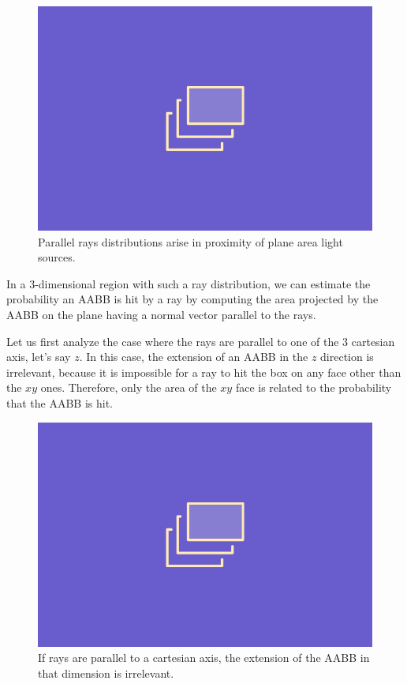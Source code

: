 \documentclass{PoliMi_MasterThesis}
\begin{document}
\begin{figure}[H]
    \centering
    \includegraphics[width=\textwidth*\real{0.5}]{Images/TODO.png}
    \caption{Parallel rays distributions arise in proximity of plane area light sources.}
    \label{fig:parallel_rays_distribution}
\end{figure}

In a 3-dimensional region with such a ray distribution, we can estimate the probability an AABB is hit by a ray by computing the area projected by the AABB on the plane having a normal vector parallel to the rays.

Let us first analyze the case where the rays are parallel to one of the 3 cartesian axis, let's say $z$. In this case, the extension of an AABB in the $z$ direction is irrelevant, because it is impossible for a ray to hit the box on any face other than the $xy$ ones. Therefore, only the area of the $xy$ face is related to the probability that the AABB is hit.

\begin{figure}[H]
    \centering
    \includegraphics[width=\textwidth*\real{0.5}]{Images/TODO.png}
    \caption{If rays are parallel to a cartesian axis, the extension of the AABB in that dimension is irrelevant.}
    \label{fig:rays_parallel_to_cartesian_dimension}
\end{figure}
\end{document}
